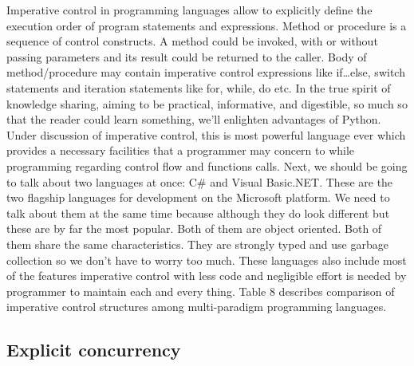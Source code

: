 \documentclass{sig-alternate}
\begin{document}
	Imperative control in programming languages allow to explicitly define the execution order of program statements and expressions. Method or procedure is a sequence of control constructs. A method could be invoked, with or without passing parameters and its result could be returned to the caller. Body of method/procedure may contain imperative control expressions like if…else, switch statements and iteration statements like for, while, do etc.
	\newline
	In the true spirit of knowledge sharing, aiming to be practical, informative, and digestible, so much so that the reader could learn something, we'll enlighten advantages of Python. Under discussion of imperative control, this is most powerful language ever which provides a necessary facilities that a programmer may concern to while programming regarding control flow and functions calls. Next, we should be going to talk about two languages at once: C\# and Visual Basic.NET. These are the two flagship languages for development on the Microsoft platform. We need to talk about them at the same time because although they do look different but these are by far the most popular. Both of them are object oriented. Both of them share the same characteristics. They are strongly typed and use garbage collection so we don't have to worry too much. These languages also include most of the features imperative control with less code and negligible effort is needed by programmer to maintain each and every thing. Table 8 describes comparison of imperative control structures among multi-paradigm programming languages. 
	
	
	\subsection{Explicit concurrency}
	
\end{document}
